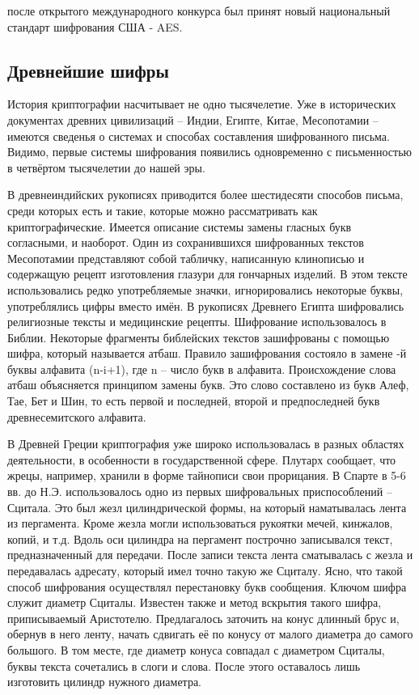 после открытого международного конкурса был принят новый национальный стандарт шифрования США - AES.




\subsection{Древнейшие шифры}
История криптографии насчитывает не одно тысячелетие. Уже в исторических документах древних цивилизаций – Индии, Египте, Китае, Месопотамии – имеются сведенья о системах и способах составления шифрованного письма. Видимо, первые системы шифрования появились одновременно с письменностью в четвёртом тысячелетии до нашей эры.

В древнеиндийских рукописях приводится более шестидесяти способов письма, среди которых есть и такие, которые можно рассматривать как криптографические. Имеется описание системы замены гласных букв согласными, и наоборот. Один из сохранившихся шифрованных текстов Месопотамии представляют собой табличку, написанную клинописью и содержащую рецепт изготовления глазури для гончарных изделий. В этом тексте использовались редко употребляемые значки, игнорировались некоторые буквы, употреблялись цифры вместо имён. В рукописях Древнего Египта шифровались религиозные тексты и медицинские рецепты. Шифрование использовалось в Библии. Некоторые фрагменты библейских текстов зашифрованы с помощью шифра, который называется атбаш. Правило зашифрования состояло в замене -й буквы алфавита (n-i+1), где n – число букв в алфавита. Происхождение слова атбаш объясняется принципом замены букв. Это слово составлено из букв Алеф, Тае, Бет и Шин, то есть первой и последней, второй и предпоследней букв древнесемитского алфавита.

В Древней Греции криптография уже широко использовалась в разных областях деятельности, в особенности в государственной сфере. Плутарх сообщает, что жрецы, например, хранили в форме тайнописи свои прорицания. В Спарте в 5-6 вв. до Н.Э. использовалось одно из первых шифровальных приспособлений – Сцитала. Это был жезл цилиндрической формы, на который наматывалась лента из пергамента. Кроме жезла могли использоваться рукоятки мечей, кинжалов, копий, и т.д. Вдоль оси цилиндра на пергамент построчно записывался текст, предназначенный для передачи. После записи текста лента сматывалась с жезла и передавалась адресату, который имел точно такую же Сциталу. Ясно, что такой способ шифрования осуществлял перестановку букв сообщения. Ключом шифра служит диаметр Сциталы. Известен также и метод вскрытия такого шифра, приписываемый Аристотелю. Предлагалось заточить на конус длинный брус и, обернув в него ленту, начать сдвигать её по конусу от малого диаметра до самого большого. В том месте, где диаметр конуса совпадал с диаметром Сциталы, буквы текста сочетались в слоги и слова. После этого оставалось лишь изготовить цилиндр нужного диаметра.

